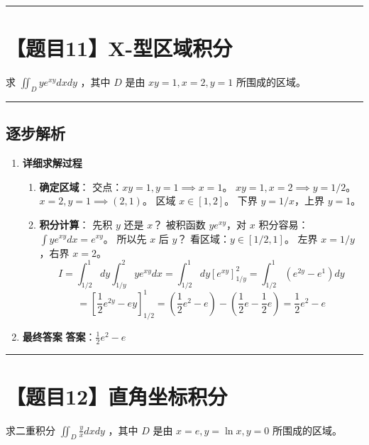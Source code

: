 \documentclass[UTF8]{ctexart}
\newenvironment{redenv}{\color{red}}{}
\newenvironment{detailedanalysis}{%
    \color{red}
    \begin{enumerate}[label=\textbf{第\arabic*步：}, leftmargin=*, align=left, itemsep=1.5ex]
}{%
    \end{enumerate}
}
\newcommand{\problemrule}{\noindent\rule{\textwidth}{1.5pt}\vspace{-0.8em}}
\newcommand{\analysisrule}{\noindent\rule{\textwidth}{0.8pt}\vspace{-0.8em}}
\begin{document}
\problemrule
\section*{【题目11】X-型区域积分}
求 $ \iint_{D} ye^{xy} dx dy $ ，其中 $D$ 是由 $ xy = 1, x = 2, y = 1 $ 所围成的区域。

\begin{redenv}
\analysisrule
\subsection*{逐步解析}

\begin{detailedanalysis}
\item \textbf{详细求解过程}
\begin{enumerate}[label=(\arabic*)]
\item \textbf{确定区域}：
交点：$xy=1, y=1 \implies x=1$。
$xy=1, x=2 \implies y=1/2$。
$x=2, y=1 \implies (2,1)$。
区域 $x \in [1, 2]$。
下界 $y=1/x$，上界 $y=1$。
\item \textbf{积分计算}：
先积 $y$ 还是 $x$？
被积函数 $ye^{xy}$，对 $x$ 积分容易：$\int ye^{xy} dx = e^{xy}$。
所以先 $x$ 后 $y$？
看区域：$y \in [1/2, 1]$。
左界 $x=1/y$，右界 $x=2$。
$$ I = \int_{1/2}^1 dy \int_{1/y}^2 y e^{xy} dx = \int_{1/2}^1 dy [e^{xy}]_{1/y}^2 = \int_{1/2}^1 (e^{2y} - e^1) dy $$
$$ = [\frac{1}{2}e^{2y} - ey]_{1/2}^1 = (\frac{1}{2}e^2 - e) - (\frac{1}{2}e - \frac{1}{2}e) = \frac{1}{2}e^2 - e $$
\end{enumerate}

\item \textbf{最终答案}
\textbf{答案}：$ \frac{1}{2}e^2 - e $
\end{detailedanalysis}
\end{redenv}

\problemrule
\section*{【题目12】直角坐标积分}
求二重积分 $ \iint_{D}\frac{y}{x}dxdy $ ，其中 $D$ 是由 $ x=e,y=\ln x,y=0 $ 所围成的区域。
\end{document}
